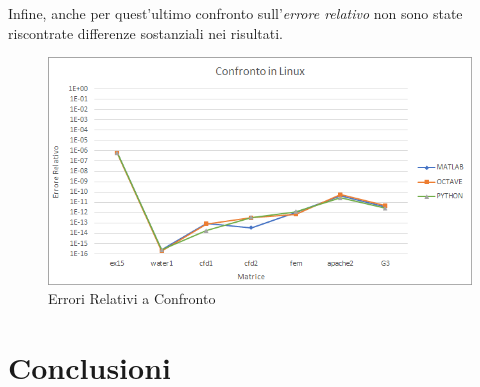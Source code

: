 \documentclass[a4paper,12pt,titlepage,oneside]{book}
\begin{document}
        \newpage
        \noindent Infine, anche per quest'ultimo confronto sull'\textit{errore relativo} non sono state riscontrate differenze sostanziali nei risultati.\\
        
        \begin{figure}[ht]
            \centering
            \includegraphics[scale=0.8]{src/plot/LINUXerr.png}
            \caption{Errori Relativi a Confronto}
            \label{plot:errlin}
        \end{figure}

\newpage
\chapter{Conclusioni}
\end{document}

